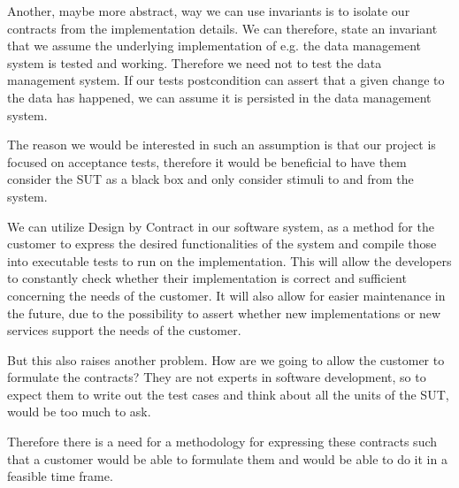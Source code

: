 Another, maybe more abstract, way we can use invariants is to isolate our contracts from the implementation details.
We can therefore, state an invariant that we assume the underlying implementation of e.g. the data management system is tested and working. 
Therefore we need not to test the data management system. If our tests postcondition can assert that a given change to the data has happened, we can assume it is persisted in the data management system.

The reason we would be interested in such an assumption is that our project is focused on acceptance tests, therefore it would be beneficial to have them consider the SUT as a black box and only consider stimuli to and from the system.

We can utilize Design by Contract in our software system, as a method for the customer to express the desired functionalities of the system and compile those into executable tests to run on the implementation. 
This will allow the developers to constantly check whether their implementation is correct and sufficient concerning the needs of the customer. 
It will also allow for easier maintenance in the future, due to the possibility to assert whether new implementations or new services support the needs of the customer.

But this also raises another problem. 
How are we going to allow the customer to formulate the contracts? 
They are not experts in software development, so to expect them to write out the test cases and think about all the units of the SUT, would be too much to ask.

Therefore there is a need for a methodology for expressing these contracts such that a customer would be able to formulate them and would be able to do it in a feasible time frame.
